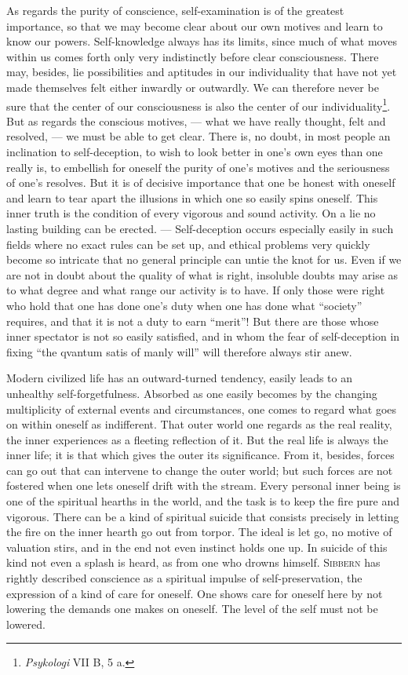 \documentclass[12pt,a4paper,openany]{book}
\newcommand{\opage}[1]{\marginnote{\footnotesize\textit{[#1]}}}
\begin{document}
\opage{194}As regards the purity of conscience, self-examination is of the greatest importance, so that we may become
clear about our own motives and learn to know our powers. Self-knowledge always has its limits, since much of
what moves within us comes forth only very indistinctly before clear consciousness. There may, besides, lie
possibilities and aptitudes in our individuality that have not yet made themselves felt either inwardly or
outwardly. We can therefore never be sure that the center of our consciousness is also the center of our
individuality\footnote[1]{\textit{Psykologi} VII B, 5 a.}. But as regards the conscious motives, --- what we
have really thought, felt and resolved, --- we must be able to get clear. There is, no doubt, in most people an
inclination to self-deception, to wish to look better in one's own eyes than one really is, to embellish for
oneself the purity of one's motives and the seriousness of one's resolves. But it is of decisive importance that
one be honest with oneself and learn to tear apart the illusions in which one so easily spins oneself. This
inner truth is the condition of every vigorous and sound activity. On a lie no lasting building can be erected.
--- Self-deception occurs especially easily in such fields where no exact rules can be set up, and ethical
problems very quickly become so intricate that no general principle can untie the knot for us. Even if we are
not in doubt about the quality of what is right, insoluble doubts may arise as to what degree and what range our
activity is to have. If only those were right who hold that one has done one's duty when one has done what
``society'' requires, and that it is not a duty to earn ``merit''! But there are those whose inner spectator is
not so easily satisfied, and in whom the fear of self-deception in fixing ``the qvantum satis of manly will''
will therefore always stir anew.

Modern civilized life has an outward-turned tendency, easily leads to an unhealthy self-forgetfulness. Absorbed
as one easily becomes by the changing multiplicity of external events and
\opage{195}circumstances, one comes to regard what goes on within oneself as indifferent. That outer world one
regards as the real reality, the inner experiences as a fleeting reflection of it. But the real life is always
the inner life; it is that which gives the outer its significance. From it, besides, forces can go out that can
intervene to change the outer world; but such forces are not fostered when one lets oneself drift with the
stream. Every personal inner being is one of the spiritual hearths in the world, and the task is to keep the
fire pure and vigorous. There can be a kind of spiritual suicide that consists precisely in letting the fire on
the inner hearth go out from torpor. The ideal is let go, no motive of valuation stirs, and in the end not even
instinct holds one up. In suicide of this kind not even a splash is heard, as from one who drowns himself.
\textsc{Sibbern} has rightly described conscience as a spiritual impulse of self-preservation, the expression of
a kind of care for oneself. One shows care for oneself here by not lowering the demands one makes on oneself. The
level of the self must not be lowered.
\end{document}
